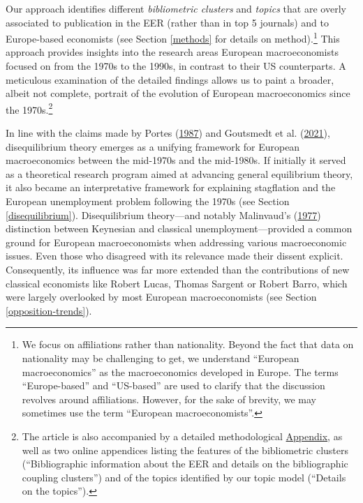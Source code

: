 \documentclass[
  12pt,
  onecolumn]{article}
\begin{document}
Our approach identifies different \emph{bibliometric clusters} and \emph{topics} that are overly associated to publication in the EER (rather than in top 5 journals) and to Europe-based economists (see Section \ref{methods} for details on method).\footnote{We focus on affiliations rather than nationality. Beyond the fact that data on nationality may be challenging to get, we understand ``European macroeconomics'' as the macroeconomics developed in Europe. The terms ``Europe-based'' and ``US-based'' are used to clarify that the discussion revolves around affiliations. However, for the sake of brevity, we may sometimes use the term ``European macroeconomists''.} This approach provides insights into the research areas European macroeconomists focused on from the 1970s to the 1990s, in contrast to their US counterparts. A meticulous examination of the detailed findings allows us to paint a broader, albeit not complete, portrait of the evolution of European macroeconomics since the 1970s.\footnote{The article is also accompanied by a detailed methodological \protect\hyperlink{appendix}{Appendix}, as well as two online appendices listing the features of the bibliometric clusters (``Bibliographic information about the EER and details on the bibliographic coupling clusters'') and of the topics identified by our topic model (``Details on the topics'').}

In line with the claims made by Portes (\protect\hyperlink{ref-portes1987}{1987}) and Goutsmedt et al. (\protect\hyperlink{ref-goutsmedt2021}{2021}), disequilibrium theory emerges as a unifying framework for European macroeconomics between the mid-1970s and the mid-1980s. If initially it served as a theoretical research program aimed at advancing general equilibrium theory, it also became an interpretative framework for explaining stagflation and the European unemployment problem following the 1970s (see Section \ref{disequilibrium}). Disequilibrium theory---and notably Malinvaud's (\protect\hyperlink{ref-malinvaud1977}{1977}) distinction between Keynesian and classical unemployment---provided a common ground for European macroeconomists when addressing various macroeconomic issues. Even those who disagreed with its relevance made their dissent explicit. Consequently, its influence was far more extended than the contributions of new classical economists like Robert Lucas, Thomas Sargent or Robert Barro, which were largely overlooked by most European macroeconomists (see Section \ref{opposition-trends}).
\end{document}

